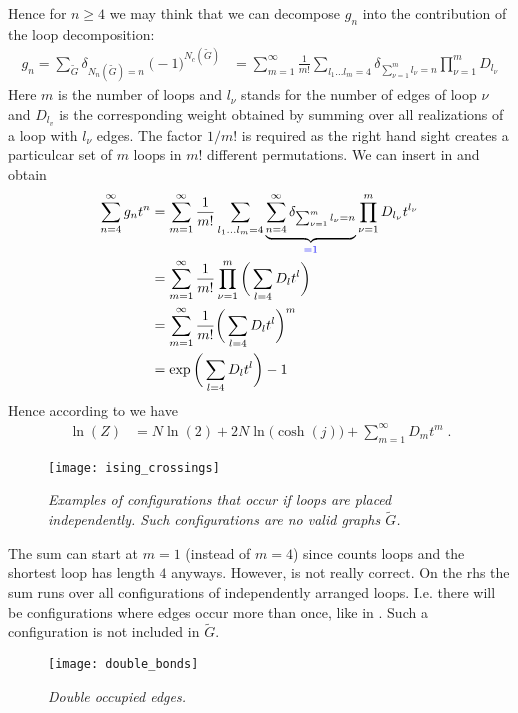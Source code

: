 Hence for $n\ge 4$ we may think that we can decompose $g_{n}$ into the contribution
of the loop decomposition:
%
\begin{align}\label{eq:ising:g:D}
g_{n}=\sum_{\tilde G} \delta_{N_{n}(\tilde G)=n} \;\big( -1 \big)^{N_{c}(\tilde G)}
&= \sum_{m=1}^{\infty} \frac{1}{m!} \sum_{l_{1}\ldots l_{m}=4}
\delta_{\sum_{\nu=1}^{m}l_{\nu} = n}
\prod_{\nu=1}^{m}
  D_{l_{\nu}}
\end{align}
%
Here $m$ is the number of loops and $l_{\nu}$ stands for the number of edges of loop $\nu$ and $D_{l_{v}}$ is the  corresponding weight obtained by summing over all realizations of a loop with $l_{\nu}$ edges. 
The factor $1/m!$ is required as the right hand sight creates a particulcar set of $m$
loops in $m!$ different permutations.
We can insert  in  and obtain
%
\begin{align*}
\sum_{n=4}^{\infty} g_{n} t^{n}&=
\sum_{m=1}^{\infty} \frac{1}{m!} \sum_{l_{1}\ldots l_{m}=4}
 \underbrace{\sum_{n=4}^{\infty}
 \delta_{\sum_{\nu=1}^{m}l_{\nu} = n }
}_{\color{blue} = 1}
\prod_{\nu=1}^{m}
  D_{l_{\nu}} t^{l_{\nu}}\\
  &=
\sum_{m=1}^{\infty} \frac{1}{m!} 
\prod_{\nu=1}^{m}
\bigg(\sum_{l=4}  D_{l} t^{l}\bigg)\\
  &=
\sum_{m=1}^{\infty} \frac{1}{m!} 
\bigg(\sum_{l=4}  D_{l} t^{l}\bigg)^{m}\\
&=\exp\bigg( \sum_{l=4}  D_{l} t^{l} \bigg)-1
\end{align*}
%
Hence according to  we have
%
\begin{align}\label{eq:ising:ln:Z}
\ln(Z) &= N \ln(2) + 2N \ln\big(\cosh(j)\big) + \sum_{m=1}^{\infty}  D_{m} t^{m} \;.
\end{align}
%
%
\begin{figure}[t]
\texttt{[image: ising\_crossings]}
\caption{{\it Examples of configurations that occur if loops are placed independently. Such configurations are no valid graphs $\tilde G$.}\label{fig:ising:crossings}}
\end{figure}
%
The sum can start at $m=1$ (instead of $m=4$) since  counts loops and the shortest loop has length $4$ anyways.
However,  is not really correct. On the rhs the sum runs over all configurations
of independently arranged loops. I.e. there will be configurations where edges occur more than once, like in . Such a configuration is not included in $\tilde G$.
%
\begin{figure}[t]
\texttt{[image: double\_bonds]}
\caption{{\it Double occupied edges.}\label{fig:ising:double:bonds}}
\end{figure}
